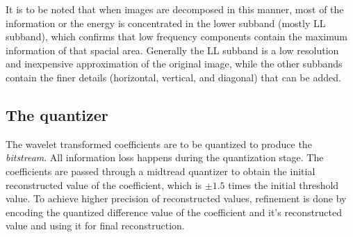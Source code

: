\documentclass[./A14_Report.tex]{subfiles}
\begin{document}
It is to be noted that when images are decomposed in this manner, most of the
information or the energy is concentrated in the lower subband (mostly LL
subband), which confirms that low frequency components contain the maximum
information of that spacial area.  Generally the LL subband is a low resolution
and inexpensive approximation of the original image, while the other subbands
contain the finer details (horizontal, vertical, and diagonal) that can be
added.

\subsection{The quantizer}
\label{sec:the_quantizer}

The wavelet transformed coefficients are to be quantized to produce the
\textit{bitstream}.  All information loss happens during the quantization
stage.  The coefficients are passed through a midtread quantizer to obtain the
initial reconstructed value of the coefficient, which is $\pm 1.5$ times the
initial threshold value.  To achieve higher precision of reconstructed values,
refinement is done by encoding the quantized difference value of the
coefficient and it's reconstructed value and using it for final reconstruction.
\end{document}
